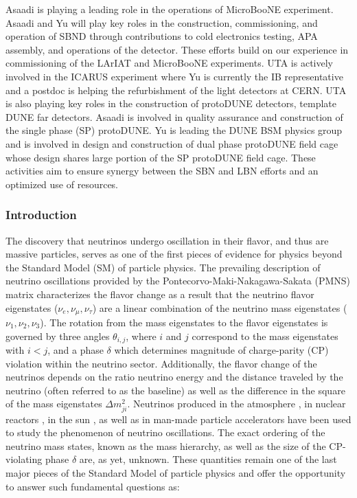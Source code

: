 Asaadi is playing a leading role in the operations of MicroBooNE experiment. 
Asaadi and Yu will play key roles in the construction, commissioning, and operation of SBND through contributions
to cold electronics testing, APA assembly, and operations of the detector. 
These efforts build on our experience in commissioning of the LArIAT and MicroBooNE experiments. 
UTA is actively involved in the ICARUS experiment where Yu is currently the IB representative and a postdoc
is helping the refurbishment of the light detectors at CERN. 
UTA is also playing key roles in the construction of protoDUNE detectors, template DUNE far detectors. 
Asaadi is involved in quality assurance and construction of the single phase (SP) protoDUNE. 
Yu is leading the DUNE BSM physics group and is involved in design and construction of dual 
phase protoDUNE field cage whose design shares large portion of the SP protoDUNE field cage. 
These activities aim to ensure synergy between the SBN and LBN efforts and an optimized use of resources.

\subsubsection{Introduction}
The discovery that neutrinos undergo oscillation in their flavor, and thus are massive particles, serves as one of the first pieces of evidence for physics beyond the Standard Model (SM) of particle physics. The prevailing description of neutrino oscillations provided by the Pontecorvo-Maki-Nakagawa-Sakata (PMNS) matrix characterizes the flavor change as a result that the neutrino flavor eigenstates ($\nu_{e}, \nu_{\mu}, \nu_{\tau}$) are a linear combination of the neutrino mass eigenstates ($\nu_{1}, \nu_{2}, \nu_{3}$). The rotation from the mass eigenstates to the flavor eigenstates is governed by three angles $\theta_{i,j}$, where $i$ and $j$ correspond to the mass eigenstates with $i < j$, and a phase $\delta$ which determines magnitude of charge-parity (CP) violation within the neutrino sector. Additionally, the flavor change of the neutrinos depends on the ratio neutrino energy and the distance traveled by the neutrino (often referred to as the baseline) as well as the difference in the square of the mass eigenstates $\Delta m_{ji}^{2}$. Neutrinos produced in the atmosphere \cite{No1, No2, No3}, in nuclear reactors \cite{No4, No5, No6}, in the sun \cite{No7, No8, No9}, as well as in man-made particle accelerators \cite{No10, No11, No12} have been used to study the phenomenon of neutrino oscillations. The exact ordering of the neutrino mass states, known as the mass hierarchy, as well as the size of the CP-violating phase $\delta$ are, as yet, unknown. These quantities remain one of the last major pieces of the Standard Model of particle physics and offer the opportunity to answer such fundamental questions as:

